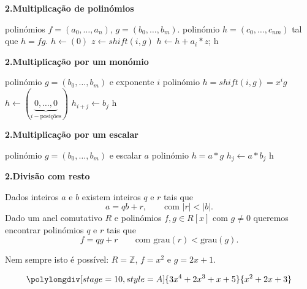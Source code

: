 \documentclass{beamer}
\newcommand{\ZZ}{\mathbb Z}
\newcommand{\grau}[1]{\mathrm{grau}({#1})}
\begin{document}
\begin{frame}[fragile]{\bf 2.}{\bf Multiplicação de polinómios}
\begin{algorithmic}
\REQUIRE polinómios $f=(a_0,\ldots, a_n)$, $g=(b_0,\ldots, b_m)$.
\ENSURE polinómio $h=(c_0, \ldots, c_{nm})$ tal que $h=fg$.
\STATE $h \leftarrow (0)$ 
  \STATE $z \leftarrow shift(i,g)$
  \STATE $h \leftarrow h + a_i*z$;
\ENDFOR
\RETURN h
\end{algorithmic}

\end{frame}

\begin{frame}[fragile]{\bf 2.}{\bf Multiplicação por um monómio}
\begin{algorithmic}
\REQUIRE polinómio $g=(b_0,\ldots, b_m)$ e exponente $i$
\ENSURE polinómio $h=shift(i,g) = x^ig$
\STATE $h \leftarrow (\underbrace{0,\ldots, 0}_{i-\mbox{posições}})$ 
  \STATE $h_{i+j} \leftarrow b_j$
\ENDFOR
\RETURN h
\end{algorithmic}

\end{frame}

\begin{frame}[fragile]{\bf 2.}{\bf Multiplicação por um escalar}
\begin{algorithmic}
\REQUIRE polinómio $g=(b_0,\ldots, b_m)$ e escalar $a$
\ENSURE polinómio $h=a*g$
  \STATE $h_j \leftarrow a*b_j$
\ENDFOR
\RETURN h
\end{algorithmic}

\end{frame}



\begin{frame}{\bf 2.}{\bf Divisão com resto}
\begin{block}{}
Dados inteiros $a$ e $b$ existem inteiros $q$ e $r$ tais que 
$$ a = qb + r, \qquad \mbox{com } |r|<|b|.$$
\pause Dado um anel comutativo $R$ e polinómios $f,g\in R[x]$ com $g\neq 0$ queremos encontrar polinómios $q$ e $r$ tais que 
$$ f=qg+r \qquad \mbox{com } \grau{r}<\grau{g}.$$
\end{block}
\pause
Nem sempre isto é possível: $R=\ZZ$, $f=x^2$ e $g=2x+1$.
\end{frame}


\begin{frame}
$$\polylongdiv[stage=10,style=A]{3x^4+2x^3+x+5}{x^2+2x+3}$$
\end{frame}
\end{document}
